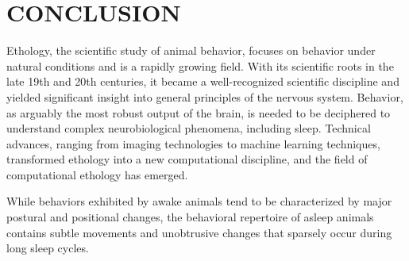 \setlength{\parindent}{0pt}
\chapter{\bf CONCLUSION}\label{chapter:conclusion}

Ethology, the scientific study of animal behavior, focuses on behavior under natural conditions and is a rapidly growing field.
With its scientific roots in the late 19th and 20th centuries, it became a well-recognized scientific discipline and yielded significant insight into general principles of the nervous system.
Behavior, as arguably the most robust output of the brain, is needed to be deciphered to understand complex neurobiological phenomena, including sleep.
Technical advances, ranging from imaging technologies to machine learning techniques, transformed ethology into a new computational discipline, and the field of computational ethology has emerged.

While behaviors exhibited by awake animals tend to be characterized by major postural and positional changes, the behavioral repertoire of asleep animals contains subtle movements and unobtrusive changes that sparsely occur during long sleep cycles.




